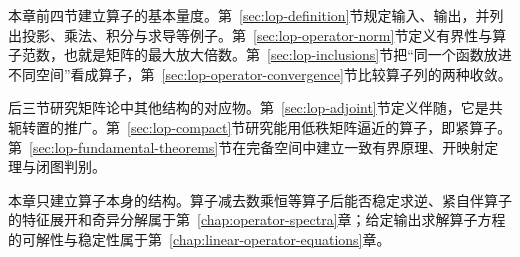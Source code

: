 本章前四节建立算子的基本量度。第~\ref{sec:lop-definition}节规定输入、输出，并列出投影、乘法、积分与求导等例子。第~\ref{sec:lop-operator-norm}节定义有界性与算子范数，也就是矩阵的最大放大倍数。第~\ref{sec:lop-inclusions}节把“同一个函数放进不同空间”看成算子，第~\ref{sec:lop-operator-convergence}节比较算子列的两种收敛。

后三节研究矩阵论中其他结构的对应物。第~\ref{sec:lop-adjoint}节定义伴随，它是共轭转置的推广。第~\ref{sec:lop-compact}节研究能用低秩矩阵逼近的算子，即紧算子。第~\ref{sec:lop-fundamental-theorems}节在完备空间中建立一致有界原理、开映射定理与闭图判别。

本章只建立算子本身的结构。算子减去数乘恒等算子后能否稳定求逆、紧自伴算子的特征展开和奇异分解属于第~\ref{chap:operator-spectra}章；给定输出求解算子方程的可解性与稳定性属于第~\ref{chap:linear-operator-equations}章。









